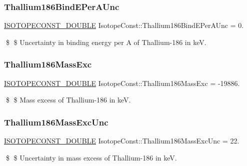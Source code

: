 \subsubsection{\texorpdfstring{Thallium186\+Bind\+E\+Per\+A\+Unc}{Thallium186BindEPerAUnc}}
{\footnotesize\ttfamily \mbox{\hyperlink{group___isotope_const-_macros_ga8f45a7272ce02c0b4c65c44636ed719a}{I\+S\+O\+T\+O\+P\+E\+C\+O\+N\+S\+T\+\_\+\+D\+O\+U\+B\+LE}} Isotope\+Const\+::\+Thallium186\+Bind\+E\+Per\+A\+Unc = 0.}

\$ \$ Uncertainty in binding energy per A of Thallium-\/186 in keV. \mbox{\label{group___isotope_const-_thallium-_tl186_ga72cbb5be273aaec787682a980030976b}} 
\subsubsection{\texorpdfstring{Thallium186\+Mass\+Exc}{Thallium186MassExc}}
{\footnotesize\ttfamily \mbox{\hyperlink{group___isotope_const-_macros_ga8f45a7272ce02c0b4c65c44636ed719a}{I\+S\+O\+T\+O\+P\+E\+C\+O\+N\+S\+T\+\_\+\+D\+O\+U\+B\+LE}} Isotope\+Const\+::\+Thallium186\+Mass\+Exc = -\/19886.}

\$ \$ Mass excess of Thallium-\/186 in keV. \mbox{\label{group___isotope_const-_thallium-_tl186_ga24cec4d4860b3b6985937b275e7ec84d}} 
\subsubsection{\texorpdfstring{Thallium186\+Mass\+Exc\+Unc}{Thallium186MassExcUnc}}
{\footnotesize\ttfamily \mbox{\hyperlink{group___isotope_const-_macros_ga8f45a7272ce02c0b4c65c44636ed719a}{I\+S\+O\+T\+O\+P\+E\+C\+O\+N\+S\+T\+\_\+\+D\+O\+U\+B\+LE}} Isotope\+Const\+::\+Thallium186\+Mass\+Exc\+Unc = 22.}

\$ \$ Uncertainty in mass excess of Thallium-\/186 in keV. \mbox{\label{group___isotope_const-_thallium-_tl186_ga20395238fddec3f93cc23c3eccd62a52}} 
